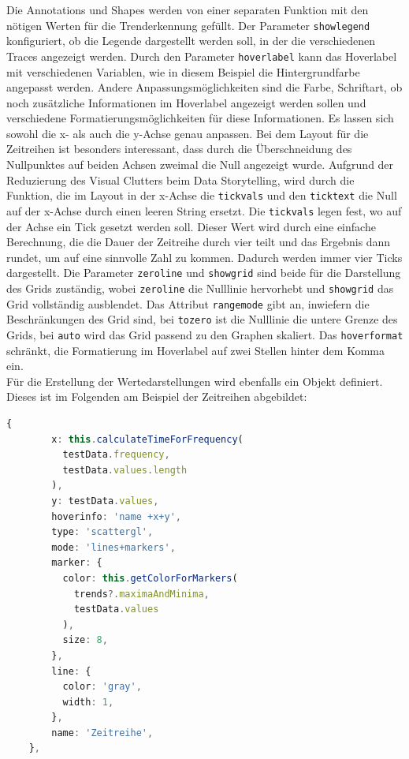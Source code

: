 Die Annotations und Shapes werden von einer separaten Funktion mit den nötigen Werten für die Trenderkennung gefüllt. Der Parameter \texttt{showlegend} konfiguriert, ob die Legende dargestellt werden soll, in der die verschiedenen Traces angezeigt werden. Durch den Parameter \texttt{hoverlabel} kann das Hoverlabel mit verschiedenen Variablen, wie in diesem Beispiel die Hintergrundfarbe angepasst werden. Andere Anpassungsmöglichkeiten sind die Farbe, Schriftart, ob noch zusätzliche Informationen im Hoverlabel angezeigt werden sollen und verschiedene Formatierungsmöglichkeiten für diese Informationen. Es lassen sich sowohl die x- als auch die y-Achse genau anpassen. Bei dem Layout für die Zeitreihen ist besonders interessant, dass durch die Überschneidung des Nullpunktes auf beiden Achsen zweimal die Null angezeigt wurde. Aufgrund der Reduzierung des Visual Clutters beim Data Storytelling, wird durch die Funktion, die im Layout in der x-Achse die \texttt{tickvals} und den \texttt{ticktext} die Null auf der x-Achse durch einen leeren String ersetzt. Die \texttt{tickvals} legen fest, wo auf der Achse ein Tick gesetzt werden soll. Dieser Wert wird durch eine einfache Berechnung, die die Dauer der Zeitreihe durch vier teilt und das Ergebnis dann rundet, um auf eine sinnvolle Zahl zu kommen. Dadurch werden immer vier Ticks dargestellt. Die Parameter \texttt{zeroline} und \texttt{showgrid} sind beide für die Darstellung des Grids zuständig, wobei \texttt{zeroline} die Nulllinie hervorhebt und \texttt{showgrid} das Grid vollständig ausblendet. Das Attribut \texttt{rangemode} gibt an, inwiefern die Beschränkungen des Grid sind, bei \texttt{tozero} ist die Nulllinie die untere Grenze des Grids, bei \texttt{auto} wird das Grid passend zu den Graphen skaliert. Das \texttt{hoverformat} schränkt, die Formatierung im Hoverlabel auf zwei Stellen hinter dem Komma ein.\\ Für die Erstellung der Wertedarstellungen wird ebenfalls ein Objekt definiert. Dieses ist im Folgenden am Beispiel der Zeitreihen abgebildet:
\begin{lstlisting}[language=Typescript]
    {
        x: this.calculateTimeForFrequency(
          testData.frequency,
          testData.values.length
        ),
        y: testData.values,
        hoverinfo: 'name +x+y',
        type: 'scattergl',
        mode: 'lines+markers',
        marker: {
          color: this.getColorForMarkers(
            trends?.maximaAndMinima,
            testData.values
          ),
          size: 8,
        },
        line: {
          color: 'gray',
          width: 1,
        },
        name: 'Zeitreihe',
    },
\end{lstlisting}
